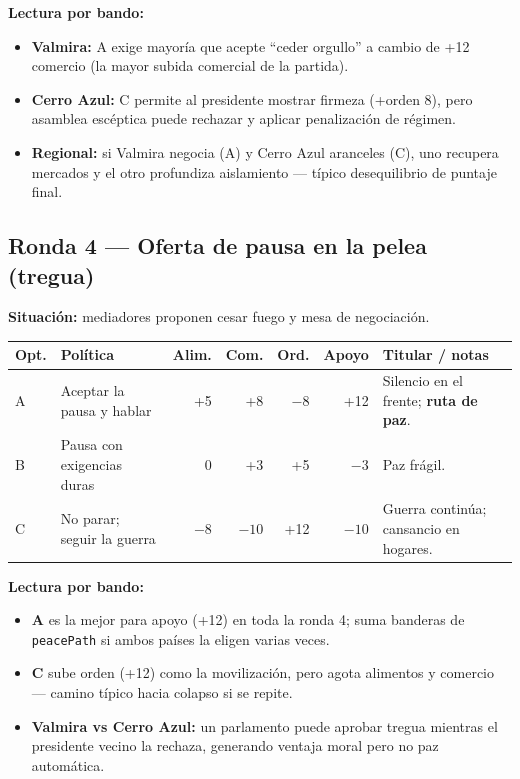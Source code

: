 \documentclass[11pt,a4paper]{article}
\begin{document}
\textbf{Lectura por bando:}
\begin{itemize}
  \item \textbf{Valmira:} A exige mayoría que acepte ``ceder orgullo'' a cambio de +12 comercio (la mayor subida comercial de la partida).
  \item \textbf{Cerro Azul:} C permite al presidente mostrar firmeza (+orden 8), pero asamblea escéptica puede rechazar y aplicar penalización de régimen.
  \item \textbf{Regional:} si Valmira negocia (A) y Cerro Azul aranceles (C), uno recupera mercados y el otro profundiza aislamiento --- típico desequilibrio de puntaje final.
\end{itemize}

\subsection{Ronda 4 --- Oferta de pausa en la pelea (tregua)}

\textbf{Situación:} mediadores proponen cesar fuego y mesa de negociación.

\begin{longtable}{@{}p{0.9cm}p{4.2cm}rrrrp{3.2cm}@{}}
\toprule
\textbf{Opt.} & \textbf{Política} & \textbf{Alim.} & \textbf{Com.} & \textbf{Ord.} & \textbf{Apoyo} & \textbf{Titular / notas} \\
\midrule
A & Aceptar la pausa y hablar & +5 & +8 & $-8$ & +12 &
  Silencio en el frente; \textbf{ruta de paz}. \\
B & Pausa con exigencias duras & 0 & +3 & +5 & $-3$ &
  Paz frágil. \\
C & No parar; seguir la guerra & $-8$ & $-10$ & +12 & $-10$ &
  Guerra continúa; cansancio en hogares. \\
\bottomrule
\end{longtable}

\textbf{Lectura por bando:}
\begin{itemize}
  \item \textbf{A} es la mejor para apoyo (+12) en toda la ronda 4; suma banderas de \texttt{peacePath} si ambos países la eligen varias veces.
  \item \textbf{C} sube orden (+12) como la movilización, pero agota alimentos y comercio --- camino típico hacia colapso si se repite.
  \item \textbf{Valmira vs Cerro Azul:} un parlamento puede aprobar tregua mientras el presidente vecino la rechaza, generando ventaja moral pero no paz automática.
\end{itemize}
\end{document}
